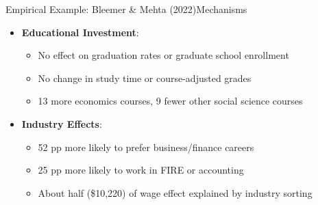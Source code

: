 \documentclass[hyperref={pdfpagelabels=false}]{beamer}
\begin{document}
\begin{frame}{Empirical Example: Bleemer \& Mehta (2022)}{Mechanisms}
	\begin{itemize}
		\item \textbf{Educational Investment}:
										\vspace{0.2cm}
		\begin{itemize}
			\item No effect on graduation rates or graduate school enrollment
											\vspace{0.2cm}
			\item No change in study time or course-adjusted grades
											\vspace{0.2cm}
			\item 13 more economics courses, 9 fewer other social science courses
											\vspace{0.2cm}
		\end{itemize}
		
		\vspace{0.2cm}
		\item \textbf{Industry Effects}:
										\vspace{0.2cm}
		\begin{itemize}
			\item 52 pp more likely to prefer business/finance careers
											\vspace{0.2cm}
			\item 25 pp more likely to work in FIRE or accounting
											\vspace{0.2cm}
			\item About half (\$10,220) of wage effect explained by industry sorting
		\end{itemize}
		
		\vspace{0.2cm}
	\end{itemize}
\end{frame}
\end{document}
